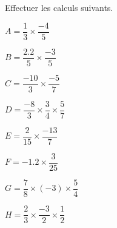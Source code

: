 \begin{exercice*}
    Effectuer les calculs suivants.

    \hspace*{-10mm}
    \begin{minipage}{\linewidth}
        \begin{spacing}{2}
            \begin{multicols}{2}
                \begin{list}{}{}                
                    \item $A=\dfrac{1}{3}\times\dfrac{-4}{5}$
                    \item $B=\dfrac{\num{2.2}}{5}\times\dfrac{-3}{5}$
                    \item $C=\dfrac{-10}{3}\times\dfrac{-5}{7}$
                    \item $D=\dfrac{-8}{3}\times\dfrac{3}{4}\times\dfrac{5}{7}$
                    \item $E=\dfrac{2}{15}\times\dfrac{-13}{7}$
                    \item $F=\num{-1.2}\times\dfrac{3}{25}$
                    \item $G=\dfrac{7}{8}\times (-3)\times\dfrac{5}{4}$
                    \item $H=\dfrac{2}{3}\times\dfrac{-3}{2}\times\dfrac{1}{2}$
                \end{list}
            \end{multicols}
        \end{spacing}
    \end{minipage}
    
    \vspace*{-10mm}
\end{exercice*}
